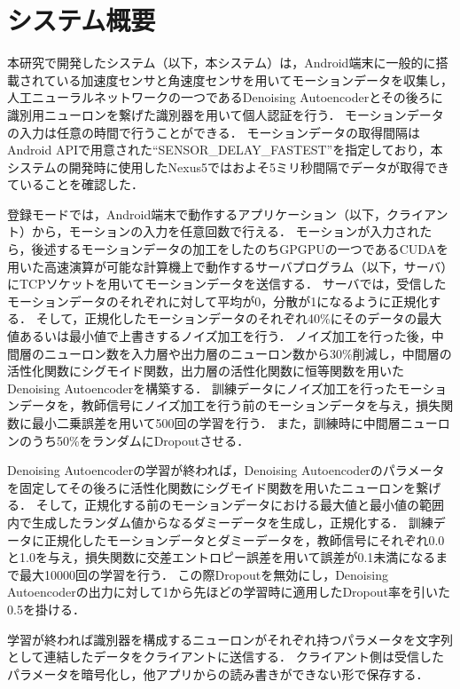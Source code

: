 \section{システム概要}
本研究で開発したシステム（以下，本システム）は，Android端末に一般的に搭載されている加速度センサと角速度センサを用いてモーションデータを収集し，人工ニューラルネットワークの一つであるDenoising Autoencoderとその後ろに識別用ニューロンを繋げた識別器を用いて個人認証を行う．
モーションデータの入力は任意の時間で行うことができる．
モーションデータの取得間隔はAndroid APIで用意された``SENSOR\_DELAY\_FASTEST''を指定しており，本システムの開発時に使用したNexus5ではおよそ5ミリ秒間隔でデータが取得できていることを確認した．

登録モードでは，Android端末で動作するアプリケーション（以下，クライアント）から，モーションの入力を任意回数で行える．
モーションが入力されたら，後述するモーションデータの加工をしたのちGPGPUの一つであるCUDAを用いた高速演算が可能な計算機上で動作するサーバプログラム（以下，サーバ）にTCPソケットを用いてモーションデータを送信する．
サーバでは，受信したモーションデータのそれぞれに対して平均が0，分散が1になるように正規化する．
そして，正規化したモーションデータのそれぞれ40\%にそのデータの最大値あるいは最小値で上書きするノイズ加工を行う．
ノイズ加工を行った後，中間層のニューロン数を入力層や出力層のニューロン数から30\%削減し，中間層の活性化関数にシグモイド関数，出力層の活性化関数に恒等関数を用いたDenoising Autoencoderを構築する．
訓練データにノイズ加工を行ったモーションデータを，教師信号にノイズ加工を行う前のモーションデータを与え，損失関数に最小二乗誤差を用いて500回の学習を行う．
また，訓練時に中間層ニューロンのうち50\%をランダムにDropoutさせる．

Denoising Autoencoderの学習が終われば，Denoising Autoencoderのパラメータを固定してその後ろに活性化関数にシグモイド関数を用いたニューロンを繋げる．
そして，正規化する前のモーションデータにおける最大値と最小値の範囲内で生成したランダム値からなるダミーデータを生成し，正規化する．
訓練データに正規化したモーションデータとダミーデータを，教師信号にそれぞれ0.0と1.0を与え，損失関数に交差エントロピー誤差を用いて誤差が0.1未満になるまで最大10000回の学習を行う．
この際Dropoutを無効にし，Denoising Autoencoderの出力に対して1から先ほどの学習時に適用したDropout率を引いた0.5を掛ける．

学習が終われば識別器を構成するニューロンがそれぞれ持つパラメータを文字列として連結したデータをクライアントに送信する．
クライアント側は受信したパラメータを暗号化し，他アプリからの読み書きができない形で保存する．

